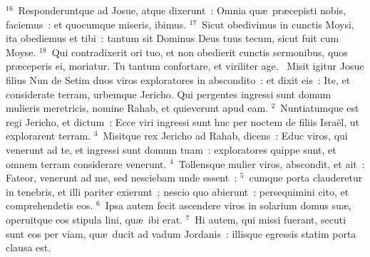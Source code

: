 ${}^{16}$~Responderuntque ad Josue, atque dixerunt~: Omnia qu\ae\ pr\ae cepisti nobis, faciemus~: et quocumque miseris, ibimus.
${}^{17}$~Sicut obedivimus in cunctis Moysi, ita obediemus et tibi~: tantum sit Dominus Deus tuus tecum, sicut fuit cum Moyse.
${}^{18}$~Qui contradixerit ori tuo, et non obedierit cunctis sermonibus, quos pr\ae ceperis ei, moriatur. Tu tantum confortare, et viriliter age.
~\lettrine[lines=10,image=true,loversize=0.05,lraise=-0.03]{M}{}isit igitur Josue filius Nun de Setim duos viros exploratores in abscondito~: et dixit eis~: Ite, et considerate terram, urbemque Jericho. Qui pergentes ingressi sunt domum mulieris meretricis, nomine Rahab, et quieverunt apud eam.
${}^{2}$~Nuntiatumque est regi Jericho, et dictum~: Ecce viri ingressi sunt huc per noctem de filiis Isra\"el, ut explorarent terram.
${}^{3}$~Misitque rex Jericho ad Rahab, dicens~: Educ viros, qui venerunt ad te, et ingressi sunt domum tuam~: exploratores quippe sunt, et omnem terram considerare venerunt.
${}^{4}$~Tollensque mulier viros, abscondit, et ait~: Fateor, venerunt ad me, sed nesciebam unde essent~:
${}^{5}$~cumque porta clauderetur in tenebris, et illi pariter exierunt~; nescio quo abierunt~: persequimini cito, et comprehendetis eos.
${}^{6}$~Ipsa autem fecit ascendere viros in solarium domus su\ae , operuitque eos stipula lini, qu\ae\ ibi erat.
${}^{7}$~Hi autem, qui missi fuerant, secuti sunt eos per viam, qu\ae\ ducit ad vadum Jordanis~: illisque egressis statim porta clausa est.



